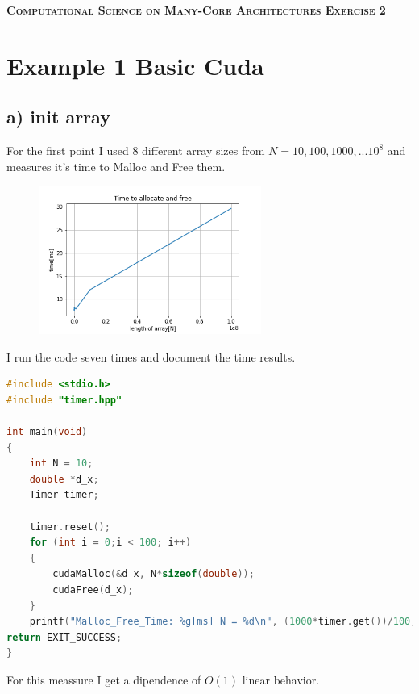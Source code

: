 \documentclass[11pt,a4paper]{article}
\begin{document}
\begin{center}
	\fontsize{24pt}{10pt}\selectfont
	\textsc{\textbf{Computational Science on Many-Core Architectures  Exercise 2}}
\end{center}
\section*{Example 1 Basic Cuda}
\subsection*{a) init array}
For the first point I used 8 different array sizes from $N
= 10,100,1000,...10^8$ and measures it's time to Malloc
and Free them.
\begin{figure}[H]
	\centering
	\includegraphics[width=0.65\textwidth]{Bilder/Time_to_allocate_and_free.png}
\end{figure}
I run the code seven times and document the time results.
\begin{lstlisting}[language=C++, caption={code for a)}]
#include <stdio.h>
#include "timer.hpp"

int main(void)
{
	int N = 10;
	double *d_x;
	Timer timer;
	
	timer.reset();
	for (int i = 0;i < 100; i++)
	{
		cudaMalloc(&d_x, N*sizeof(double));
		cudaFree(d_x);
	}
	printf("Malloc_Free_Time: %g[ms] N = %d\n", (1000*timer.get())/100,N);
return EXIT_SUCCESS;
}
\end{lstlisting}
For this meassure I get a dipendence of $O(1)$ linear behavior.
\newpage
\end{document}
